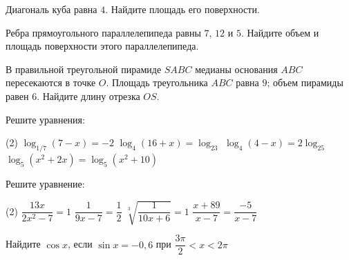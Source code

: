 \begin{homework}[number=1]
\begin{listofex}
		\item Диагональ куба равна \( 4 \). Найдите площадь его поверхности.
		\item Ребра прямоугольного параллелепипеда равны \( 7 \), \( 12 \) и \( 5 \). Найдите объем и площадь поверхности этого параллелепипеда.
		\item В правильной треугольной пирамиде \(SABC\) медианы основания \(ABC\) пересекаются в точке \(O\). Площадь треугольника \(ABC\) равна \(9\); объем пирамиды равен \(6\). Найдите длину отрезка \(OS\).
		\newpage
		\item Решите уравнения:
		\begin{tasks}(2)
			\task \( \log_{1/7}(7-x)=-2\)
			\task \( \log_4(16+x)=\log_23 \)
			\task \( \log_4(4-x)=2\log_25 \)
			\task \( \log_5(x^2+2x)=\log_5(x^2+10) \)
		\end{tasks}
		\item Решите уравнение:
		\begin{tasks}(2)
			\task \( \dfrac{13x}{2x^2-7}=1 \)
			\task \( \dfrac{1}{9x-7}=\dfrac{1}{2} \)
			\task \( \sqrt[3]{\dfrac{1}{10x+6}}=1 \)
			\task \( \dfrac{x+89}{x-7}=\dfrac{-5}{x-7} \)
		\end{tasks}
		\item Найдите \( \cos x\), если \( \sin x=-0,6 \) при \( \dfrac{3\pi}{2}<x<2\pi \)
	\end{listofex}
\end{homework}

